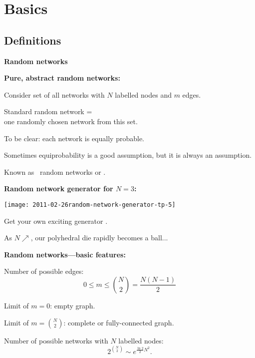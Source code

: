 \section{Basics}

\subsection{Definitions}

\begin{frame}[label=]
  \textbf{Random networks}
  
  \textbf{Pure, abstract random networks:}
    
    
      Consider set of all networks with $N$ labelled nodes
      and $m$ edges.
     
      Standard random network = \\
      one \alert{randomly chosen} network from this set.
     
      To be clear: each network is \alert{equally} probable.
     
      Sometimes equiprobability is a good assumption, but
      it is always an assumption.
     
      Known as \erdosrenyi\ random networks 
      or .
    
  
  

\begin{frame}[label=]
  \textbf{Random network generator for $N=3$:}

  \texttt{[image: 2011-02-26random-network-generator-tp-5]}

  
   
    Get your own exciting generator
    .
   
    As $N \nearrow$, our polyhedral die rapidly becomes a ball...
  



\begin{frame}[label=]
  \textbf{Random networks---basic features:}

    
     
      Number of possible edges:
      $$
      0 \le m \le \binom{N}{2} = \frac{N(N-1)}{2}
      $$
    
      Limit of $m = 0$: empty graph.
          
      Limit of $m = \binom{N}{2}$: complete or fully-connected graph.
    
      Number of possible networks with $N$
      labelled nodes: 
      $$
      2^{\binom{N}{2}} \sim e^{\frac{\ln{2}}{2} N^2}.
      $$
    

\end{frame}
\end{frame}
\end{frame}
